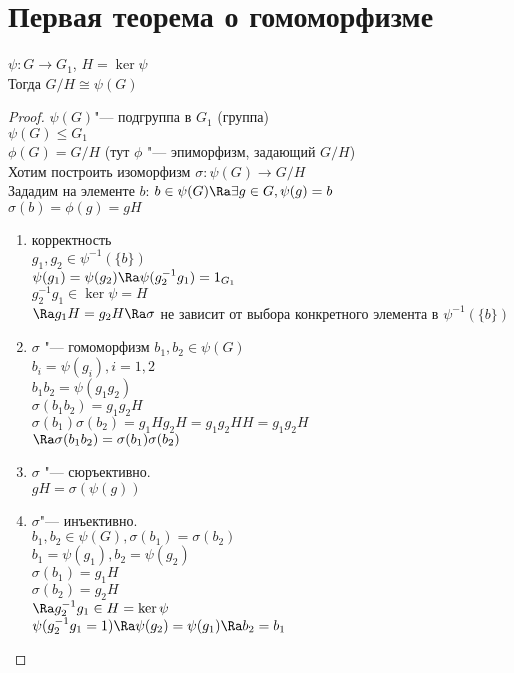﻿\section{Первая теорема о гомоморфизме}
\begin{theorem}
$\psi \colon G \to G_1$, $H = \ker \psi$\\
Тогда $G / H \cong \psi(G)$\\
\end{theorem}
\begin{proof}
$\psi(G)$"--- подгруппа в $G_1$ (группа)\\
$\psi(G) \le G_1$\\
$\phi(G) = G / H$ (тут $\phi$ "--- эпиморфизм, задающий $G/H$)\\
Хотим построить изоморфизм $\sigma\colon \psi(G) \to G / H$\\

Зададим на элементе $b$:
$b \in \psi(G) \Ra \exists g \in G, \psi(g) = b$\\
$\sigma(b) = \phi(g) = gH$\\
\begin{enumerate}
\item корректность\\
$g_1, g_2 \in \psi^{-1}(\{b\})$\\
$\psi(g_1) = \psi(g_2) \Ra \psi(g_2^{-1}g_1) = 1_{G_1}$\\
$g_2^{-1}g_1 \in \ker\psi = H$\\
$\Ra g_1H = g_2H \Ra \sigma$ не зависит от выбора конкретного элемента в $\psi^{-1}(\{b\})$\\
\item $\sigma$ "--- гомоморфизм
$b_1, b_2 \in \psi(G)$ \\
$b_i = \psi(g_i), i = 1,2$\\
$b_1b_2 = \psi(g_1g_2)$\\
$\sigma(b_1b_2) = g_1g_2H$\\
$\sigma(b_1)\sigma(b_2) = g_1Hg_2H = g_1g_2HH = g_1g_2H$\\
$\Ra \sigma(b_1b_2) = \sigma(b_1)\sigma(b_2)$\\
\item $\sigma$ "--- сюръективно.\\
$gH = \sigma(\psi(g))$\\
\item $\sigma$"--- инъективно.\\
$b_1, b_2 \in \psi(G), \sigma(b_1) = \sigma(b_2)$\\
$b_1 = \psi(g_1), b_2 = \psi(g_2)$\\
$\sigma(b_1) = g_1H$\\
$\sigma(b_2) = g_2H$\\
$\Ra g_2^{-1}g_1 \in H = \ker \psi$\\
$\psi(g_2^{-1}g_1 = 1) \Ra \psi(g_2) = \psi(g_1) \Ra b_2 = b_1$\\
\end{enumerate}
\end{proof}
